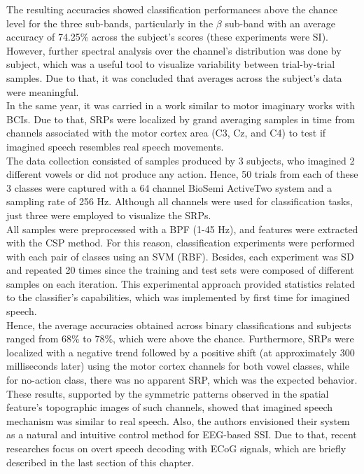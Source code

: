 The resulting accuracies showed classification performances above the chance level for the three sub-bands, particularly in the $\beta$ sub-band with an average accuracy of 74.25\% across the subject's scores (these experiments were SI). However, further spectral analysis over the channel's distribution was done by subject, which was a useful tool to visualize variability between trial-by-trial samples. Due to that, it was concluded that averages across the subject's data were meaningful.\\

In the same year, it was carried in \cite{dasalla2009spatial} a work similar to motor imaginary works with BCIs. Due to that, SRPs were localized by grand averaging samples in time from channels associated with the motor cortex area (C3, Cz, and C4) to test if imagined speech resembles real speech movements.\\

The data collection consisted of samples produced by 3 subjects, who imagined 2 different vowels or did not produce any action. Hence, 50 trials from each of these 3 classes were captured with a 64 channel BioSemi ActiveTwo system and a sampling rate of 256 Hz. Although all channels were used for classification tasks, just three were employed to visualize the SRPs.\\

All samples were preprocessed with a BPF (1-45 Hz), and features were extracted with the CSP method. For this reason, classification experiments were performed with each pair of classes using an SVM (RBF). Besides, each experiment was SD and repeated 20 times since the training and test sets were composed of different samples on each iteration. This experimental approach provided statistics related to the classifier's capabilities, which was implemented by first time for imagined speech.\\

Hence, the average accuracies obtained across binary classifications and subjects ranged from 68\% to 78\%, which were above the chance. Furthermore, SRPs were localized with a negative trend followed by a positive shift (at approximately 300 milliseconds later) using the motor cortex channels for both vowel classes, while for no-action class, there was no apparent SRP, which was the expected behavior.\\

These results, supported by the symmetric patterns observed in the spatial feature's topographic images of such channels, showed that imagined speech mechanism was similar to real speech. Also, the authors envisioned their system as a natural and intuitive control method for EEG-based SSI. Due to that, recent researches focus on overt speech decoding with ECoG signals, which are briefly described in the last section of this chapter.

